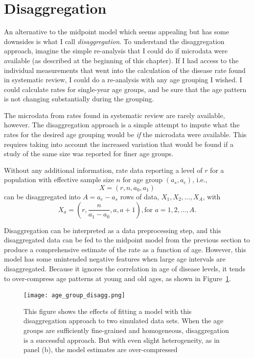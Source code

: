 \section{Disaggregation}
An alternative to the midpoint model which seems appealing but has
some downsides is what I call \emph{disaggregation}.  To understand
the disaggregation approach, imagine the simple re-analysis that I
could do if microdata were available (as described at the beginning of
this chapter).  If I had access to the individual measurements that
went into the calculation of the disease rate found in systematic
review, I could do a re-analysis with any age grouping I wished. I
could calculate rates for single-year age groups, and be sure that the
age pattern is not changing substantially during the grouping.

The microdata from rates found in systematic review are rarely
available, however. The disaggregation approach is a simple attempt to
impute what the rates for the desired age grouping would be \emph{if}
the microdata were available. This requires taking into account the
increased variation that would be found if a study of the same size
was reported for finer age groups.

Without any additional information, rate data reporting a level of $r$
for a population with effective sample size $n$ for age group $(a_s,a_e)$, i.e.,
\[
X = (r, n, a_0, a_1)
\]
can be disaggregated into $A = a_e-a_s$ rows of
data, $X_1, X_2, \ldots, X_A$, with 
\[ 
X_a = \left(r, \frac{n}{a_1-a_0}, a, a+1\right), \text{for } a=1,2,\ldots,A. 
\]

Disaggregation can be interpreted as a data preprocessing step, and
this disaggregated data can be fed to the midpoint model from the
previous section to produce a comprehensive estimate of the rate as a
function of age. However, this model has some unintended negative
features when large age intervals are disaggregated.  Because it
ignores the correlation in age of disease levels, it tends to
over-compress age patterns at young and old ages, as shown in Figure~\ref{disagg}.

\begin{figure}[h]
\begin{center}
\texttt{[image: age\_group\_disagg.png]}
\caption{This figure shows the effects of fitting a model with this
  disaggregation approach to two simulated data sets.  When the age groups are sufficiently
  fine-grained and homogeneous, disaggregation is a successful
  approach.  But with even slight heterogeneity, as in panel (b), the model
  estimates are over-compressed}
\label{disagg}
\end{center}
\end{figure}


